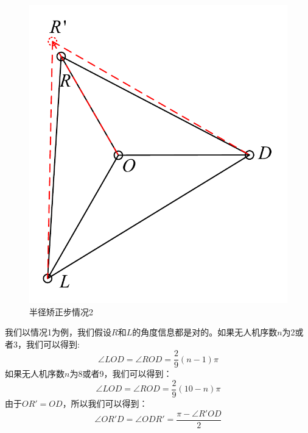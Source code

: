 \documentclass[12pt,AutoFakeSlant,AutoFakeBold]{article}
\begin{document}
\begin{figure}[!ht]
\begin{minipage}[t]{0.45\textwidth}
        \includegraphics[width=\textwidth]{图片/半径矫正步2.pdf}
        \caption{半径矫正步情况2}
        \label{fig:半径矫正步2}
    \end{minipage}
\end{figure}

我们以情况1为例，我们假设$R$和$L$的角度信息都是对的。如果无人机序数$n$为2或者3，我们可以得到:
\begin{equation}
    \angle LOD = \angle ROD = \frac{2}{9}(n-1)\pi
    \label{eq:上方}
\end{equation}
如果无人机序数$n$为8或者9，我们可以得到：
\begin{equation}
    \angle LOD = \angle ROD = \frac{2}{9}(10-n)\pi
    \label{eq:下方}
\end{equation}
由于$OR'=OD$，所以我们可以得到：
\begin{equation}
    \angle OR'D = \angle ODR' = \frac{\pi - \angle R'OD}{2}
\end{equation}
\end{document}
